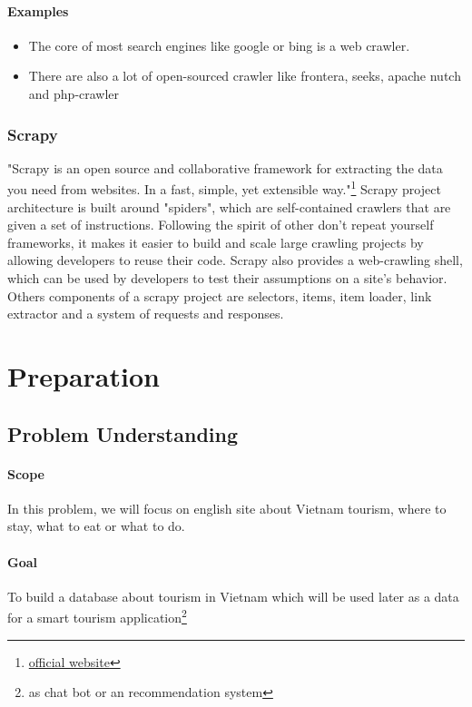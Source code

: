 \documentclass[11pt,a4paper]{report}
\begin{document}
		\subsubsection{Examples}
		\begin{itemize}
			\item The core of most search engines like google or bing is a web crawler.
			\item There are also a lot of open-sourced crawler like frontera, seeks, apache nutch and php-crawler
		\end{itemize}
	\subsection{Scrapy}
	"Scrapy is an open source and collaborative framework for extracting the data you need from websites. In a fast, simple, yet extensible way."\footnote{\href{https://scrapy.org/}{official website}}
	Scrapy project architecture is built around "spiders", which are self-contained crawlers that are given a set of instructions. Following the spirit of other don't repeat yourself frameworks, it makes it easier to build and scale large crawling projects by allowing developers to reuse their code. Scrapy also provides a web-crawling shell, which can be used by developers to test their assumptions on a site’s behavior. Others components of a scrapy project are selectors, items, item loader, link extractor and a system of requests and responses.
\chapter{Preparation}
\newpage
\section{Problem Understanding}
	\subsubsection{Scope}
	In this problem, we will focus on english site about Vietnam tourism, where to stay, what to eat or what to do.
	\subsubsection{Goal}
	To build a database about tourism in Vietnam which will be used later as a data for a smart tourism application\footnote{as chat bot or an recommendation system}
\end{document}

